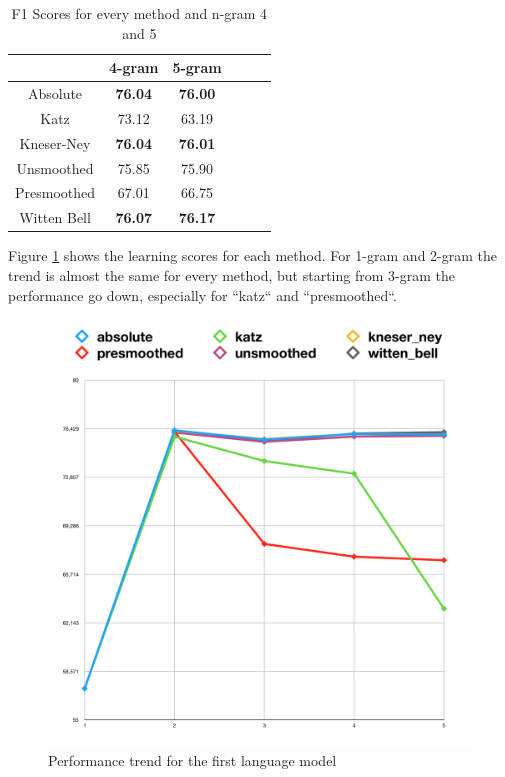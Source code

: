 \documentclass[11pt,a4paper]{article}
\begin{document}
\begin{table}[ht]
\begin{center}
\begin{tabular}{|c|c|c|c|c|c|}
\hline
& 4-gram & 5-gram \\ \hline
Absolute & \textbf{76.04} & \textbf{76.00} \\ \hline
Katz & 73.12 & 63.19 \\ \hline
Kneser-Ney & \textbf{76.04} & \textbf{76.01} \\ \hline
Unsmoothed & 75.85 & 75.90 \\ \hline
Presmoothed & 67.01 & 66.75 \\ \hline
Witten Bell & \textbf{76.07} & \textbf{76.17} \\ \hline
\end{tabular}
\caption{F1 Scores for every method and n-gram 4 and 5}
\label{f1-scores2}
\end{center}
\end{table}

Figure \ref{fig:performance1} shows the learning scores for each method. For 1-gram and 2-gram the trend is almost the same for every method, but starting from 3-gram the performance go down, especially for ``katz`` and ``presmoothed``.
\begin{figure}[ht]
  \includegraphics[width=\linewidth]{img/results.png}
  \caption{Performance trend for the first language model}
  \label{fig:performance1}
\end{figure}
\end{document}
